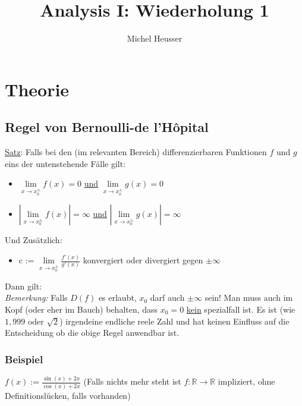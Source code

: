 \documentclass[11pt]{article} %
\title{Analysis I: Wiederholung 1}
\author{Michel Heusser}
\begin{document}
\maketitle



\section{Theorie}

\subsection{Regel von Bernoulli-de l'Hôpital}
\underline{Satz}: Falls bei den (im relevanten Bereich) differenzierbaren Funktionen $f$ und $g$ eins der untenstehende Fälle gilt:
\begin{itemize}
\item $\lim\limits_{x\rightarrow x_0^\pm} f(x) = 0$ \underline{und} $\lim\limits_{x\rightarrow x_0^\pm} g(x) = 0$
\item $|\lim\limits_{x \rightarrow x_0^\pm} f(x) |= \infty$ \underline{und} $|\lim\limits_{x\rightarrow x_0^\pm} g(x) |= \infty$
\end{itemize}
Und Zusätzlich:
\begin{itemize}
\item c := $\lim \limits_{x \rightarrow x_0^\pm} \frac{f'(x)}{g'(x)} $ konvergiert oder divergiert gegen $\pm \infty$
\end{itemize}
Dann gilt: 
\\

\emph{Bemerkung:} Falls $D(f)$ es erlaubt, $x_0$ darf auch $\pm \infty$ sein! Man muss auch im Kopf (oder eher im Bauch) behalten, dass $x_0 = 0$ \underline{kein} spezialfall ist. Es ist (wie $1, 999$ oder $\sqrt2$) irgendeine endliche reele Zahl und hat keinen Einfluss auf die Entscheidung ob die obige Regel anwendbar ist.

\subsubsection{Beispiel}
$f(x) := \frac{\sin(x)+2x}{\cos(x)+2x}$ (Falls nichts mehr steht ist $f: \mathbb{R}\rightarrow \mathbb{R}$ impliziert, ohne Definitionslücken, falls vorhanden)\\
\end{document}
